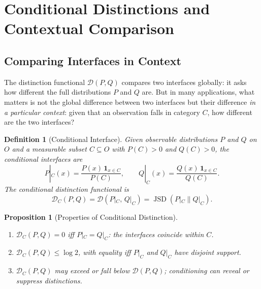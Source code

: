 \documentclass[12pt,a4paper]{article}
\newtheorem{proposition}[theorem]{Proposition}
\newtheorem{definition}[theorem]{Definition}
\theoremstyle{remark}
\theoremstyle{definition}
\begin{document}
\section{Conditional Distinctions and Contextual Comparison}

\subsection{Comparing Interfaces in Context}

The distinction functional $\mathcal{D}(P,Q)$ compares two interfaces
globally: it asks how different the full distributions $P$ and $Q$ are.
But in many applications, what matters is not the global difference
between two interfaces but their difference \emph{in a particular
context}: given that an observation falls in category $C$, how different
are the two interfaces?

\begin{definition}[Conditional Interface]
Given observable distributions $P$ and $Q$ on $O$ and a measurable
subset $C \subseteq O$ with $P(C) > 0$ and $Q(C) > 0$, the
\emph{conditional interfaces} are
\begin{equation}
  P|_C(x) = \frac{P(x)\,\mathbf{1}_{x \in C}}{P(C)},
  \qquad
  Q|_C(x) = \frac{Q(x)\,\mathbf{1}_{x \in C}}{Q(C)}.
\end{equation}
The \emph{conditional distinction functional} is
\begin{equation}
  \mathcal{D}_C(P,Q) = \mathcal{D}(P|_C,\, Q|_C)
  = \operatorname{JSD}(P|_C \| Q|_C).
\end{equation}
\end{definition}

\begin{proposition}[Properties of Conditional Distinction]
\begin{enumerate}[label=\textup{(\roman*)},leftmargin=*]
  \item $\mathcal{D}_C(P,Q) = 0$ iff $P|_C = Q|_C$:
        the interfaces coincide within $C$.
  \item $\mathcal{D}_C(P,Q) \leq \log 2$, with equality iff
        $P|_C$ and $Q|_C$ have disjoint support.
  \item $\mathcal{D}_C(P,Q)$ may exceed or fall below $\mathcal{D}(P,Q)$;
        conditioning can reveal or suppress distinctions.
\end{enumerate}
\end{proposition}
\end{document}
